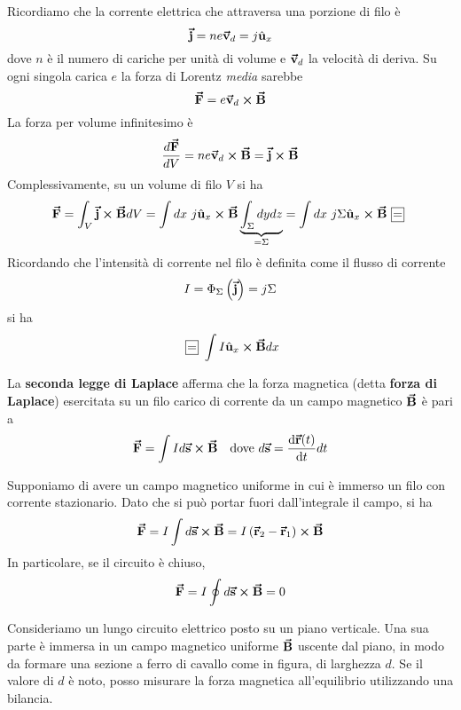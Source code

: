 Ricordiamo che la corrente elettrica che attraversa una porzione di filo è
\begin{equation*}
	\vb*{\va{j}}=ne\vb*{\va{v}}_d=j\hat{\mathbf{u}}_x
\end{equation*}
dove $n$ è il numero di cariche per unità di volume e $\vb*{\va{v}}_d$ la velocità di deriva. Su ogni singola carica $e$ la forza di Lorentz \textit{media} sarebbe
\begin{equation*}
	\vb*{\va{F}}=e\vb*{\va{v}}_d\cross\vb*{\va{B}}
\end{equation*}
La forza per volume infinitesimo è
\begin{equation*}
	\frac{d\vb*{\va{F}}}{dV}=ne\vb*{\va{v}}_d\cross\vb*{\va{B}}=\vb*{\va{j}}\cross\vb*{\va{B}}
\end{equation*}
Complessivamente, su un volume di filo $V$ si ha
\begin{equation}
	\vba{F}=\int_V\vba{j}\cross\vba{B}dV=\int dx\ j\vbh{u}_x\cross\vba{B}\underbrace{\int_{\Sigma}dydz}_{=\Sigma}=\int dx\ j\Sigma \vbh{u}_x\cross\vba{B}\squarequal
\end{equation}
Ricordando che l'intensità di corrente nel filo è definita come il flusso di corrente
\begin{equation*}
	I=\Phi_{\Sigma}\left(\vb*{\va{j}}\right)=j\Sigma
\end{equation*}
si ha
\begin{equation*}
	\squarequal\int I\vbh{u}_x\cross\vba{B}dx
\end{equation*}
\begin{define}
	La \textbf{seconda legge di Laplace} afferma che la forza magnetica (detta \textbf{forza di Laplace}) esercitata su un filo carico di corrente da un campo magnetico $\vb*{\va{B}}$ è pari a
	\begin{align}
		\vba{F}=\int I d\vba{s}\cross\vba{B}&& \text{dove}\ d\vba{s}=\dv{\vba{r}(t)}{t}dt
	\end{align}
\end{define}
\begin{example}\label{RisultateSpiraNulla}
	Supponiamo di avere un campo magnetico uniforme in cui è immerso un filo con corrente stazionario. Dato che si può portar fuori dall'integrale il campo, si ha
	\begin{equation}
		\vb*{\va{F}}=I\int d\vb*{\va{s}}\cross\vb*{\va{B}}=I\left(\vb*{\va{r}}_2-\vb*{\va{r}}_1\right)\cross\vb*{\va{B}}
	\end{equation}
In particolare, se il circuito è chiuso,
\begin{equation}
	\vb*{\va{F}}=I\oint d\vb*{\va{s}}\cross\vb*{\va{B}}=0
\end{equation}
\end{example}
\begin{observe}
	Consideriamo un lungo circuito elettrico posto su un piano verticale. Una sua parte è immersa in un campo magnetico uniforme $\vb*{\va{B}}$ uscente dal piano, in modo da formare una sezione a ferro di cavallo come in figura, di larghezza $d$.
	Se il valore di $d$ è noto, posso misurare la forza magnetica all'equilibrio utilizzando una bilancia.
\end{observe}
